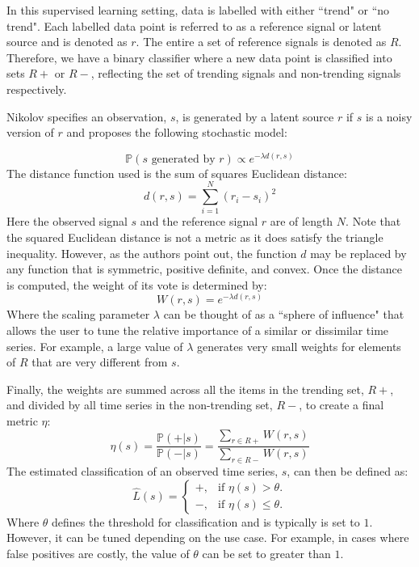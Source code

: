 In this supervised learning setting, data is labelled with either ``trend" or ``no trend". Each labelled data point is referred to as a reference signal or latent source and is denoted as $r$. The entire a set of reference signals is denoted as $R$. Therefore, we have a binary classifier where a new data point is classified into sets $R+$ or $R-$, reflecting the set of trending signals and non-trending signals respectively. 

Nikolov  \cite{nikolov2012trend} specifies an observation, $s$, is generated by a latent source
$r$ if $s$ is a noisy version of $r$ and proposes the following stochastic model:

\begin{equation}
\mathbb{P}(s \text{ generated by }  r) \propto e^{-\lambda d(r,s)} 
\end{equation}
The distance function used is the sum of squares Euclidean distance:
\begin{equation}
d(r,s) = \sum_{i=1}^N (r_i - s_i)^2 
\end{equation}
Here the observed signal $s$ and the reference signal $r$ are of length $N$. Note that the squared Euclidean distance is not a metric as it does satisfy the triangle inequality. However, as the authors point out,  the function $d$ may be replaced by any function that is symmetric, positive definite, and convex. 
Once the distance is computed, the weight of its vote is determined by: 
\begin{equation}
W(r,s) = e^{-\lambda d(r,s)}
\end{equation}
Where the scaling parameter $\lambda$ can be thought of as a ``sphere of influence" that allows the user to tune the relative importance of a similar or dissimilar time series. For example, a large value of $\lambda$ generates very small weights for elements of $R$ that are very different from $s$.

Finally, the weights are summed across all the items in the trending set, $R+$, and divided by all time series in the non-trending set, $R-$, to create a final metric $\eta$:
\begin{equation}
\eta(s)=\frac{\mathbb{P}(+|s)}{\mathbb{P}{(-|s)}} =\frac{\sum_{r \in R+} W(r,s)}{\sum_{r \in R-}W(r,s)}
\end{equation}
The estimated classification of an observed time series, $s$, can then be defined as:
\begin{equation}
  \hat{L}(s)=\begin{cases}
    +, & \text{if $\eta(s)>\theta$}.\\
    -, & \text{if $\eta(s) \leq \theta$}.
  \end{cases}
\end{equation}
Where $\theta$ defines the threshold for classification and is typically is set to $1$. However, it can be tuned depending on the use case. For example, in cases where false positives are costly, the value of $\theta$ can be set to greater than $1$. 


